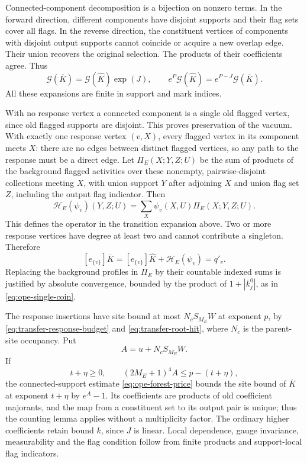 Connected-component decomposition is a bijection on nonzero
terms. In the forward direction, different components have disjoint
supports and their flag sets cover all flags. In the reverse
direction, the constituent vertices of components with disjoint
output supports cannot coincide or acquire a new overlap edge.
Their union recovers the original selection. The products of their
coefficients agree. Thus
\begin{equation}\label{eq:transfer-closure}
       \mathcal G(\overline K)=\mathcal G(\widehat K)\exp(J),
 \qquad e^P\mathcal G(\widehat K)
                           =e^{P-J}\mathcal G(\overline K).
\end{equation}
All these expansions are finite in support and mark indices.

With no response vertex a connected component is a single old
flagged vertex, since old flagged supports are disjoint. This
proves preservation of the vacuum. With exactly one response
vertex $(v,X)$, every flagged vertex in its component meets $X$:
there are no edges between distinct flagged vertices, so any path
to the response must be a direct edge. Let
$\Pi_E(X;Y,Z;U)$ be the sum of products of the background flagged
activities over these nonempty, pairwise-disjoint collections
meeting $X$, with union support $Y$ after adjoining $X$ and union
flag set $Z$, including the output flag indicator. Then
\[
 \mathcal H_E(\psi_v)(Y,Z;U)
                  =\sum_X\psi_v(X,U)\Pi_E(X;Y,Z;U).
\]
This defines the operator in the transition expansion above.
Two or more response vertices have degree at least two and cannot
contribute a singleton. Therefore
\[
 [e_{\{v\}}]\overline K
       =[e_{\{v\}}]\widehat K+\mathcal H_E(\psi_v)=q'_v.
\]
Replacing the background profiles in $\Pi_E$ by their countable
indexed sums is justified by absolute convergence, bounded by
the product of $1+|k_j^0|$, as in
\eqref{eq:ope-single-coin}.

The response insertions have site bound at most
$N_cS_{M_E}W$ at exponent $p$, by
\eqref{eq:transfer-response-budget} and
\eqref{eq:transfer-root-hit}, where $N_c$ is the parent-site
occupancy. Put
\[
                              A=u+N_cS_{M_E}W.
\]
If
\begin{equation}\label{eq:transfer-closure-budget}
 t+\eta\ge0,\qquad
               (2M_E+1)^4A\le p-(t+\eta),
\end{equation}
the connected-support estimate \eqref{eq:ope-forest-price} bounds
the site bound of $\overline K$ at exponent $t+\eta$ by $e^A-1$.
Its coefficients are products of old coefficient majorants, and
the map from a constituent set to its output pair is unique;
thus the counting lemma applies without a multiplicity factor.
The ordinary higher coefficients retain bound $k$, since $J$ is
linear. Local dependence, gauge invariance, measurability and the
flag condition follow from finite products and support-local flag
indicators.

